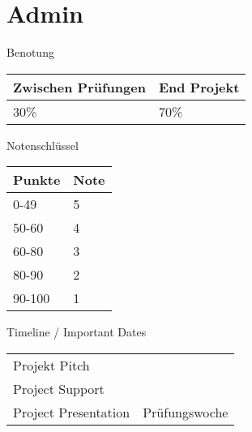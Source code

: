
\section{Admin}
 \frame{\sectionpage}

\begin{frame}{Benotung}

 
\begin{table}[]
\begin{tabular}{l|l}
Zwischen Prüfungen & End Projekt \\ \hline
30\%                & 70\%       
\end{tabular}
\end{table}


\end{frame}


\begin{frame}{Notenschlüssel}

 
\begin{table}[]
\begin{tabular}{l|l}
Punkte & Note \\ \hline
0-49   & 5    \\
50-60  & 4    \\
60-80  & 3    \\
80-90  & 2    \\
90-100 & 1   
\end{tabular}
\end{table}

\end{frame}


\begin{frame}{Timeline / Important Dates}

\begin{table}[]
\begin{tabular}{l|l}
Projekt Pitch        &               \\
Project Support      &               \\
Project Presentation & Prüfungswoche
\end{tabular}
\end{table}

\end{frame}
